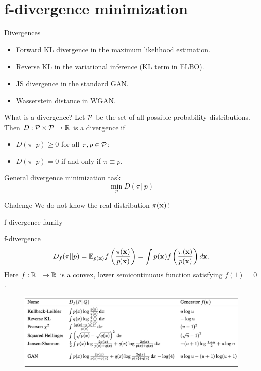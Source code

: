 \section{f-divergence minimization}
\begin{frame}{Divergences}
	\begin{itemize}
		\item Forward KL divergence in the maximum likelihood estimation.
		\item Reverse KL in the variational inference (KL term in ELBO).
		\item JS divergence in the standard GAN.
		\item Wasserstein distance in WGAN.
	\end{itemize}
	\begin{block}{What is a divergence?}
		Let $\mathcal{P}$ be the set of all possible probability distributions. Then $D: \mathcal{P} \times \mathcal{P} \rightarrow \mathbb{R}$ is a divergence if 
		\begin{itemize}
			\item $D(\pi || p) \geq 0$ for all $\pi, p \in \mathcal{P}$;
			\item $D(\pi || p) = 0$ if and only if $\pi \equiv p$.
		\end{itemize}
	\end{block}
	\begin{block}{General divergence minimization task}
		\vspace{-0.3cm}
		\[
			\min_p D(\pi || p)
		\]
		\vspace{-0.7cm}
	\end{block}
	\begin{block}{Chalenge}
		We do not know the real distribution $\pi(\mathbf{x})$!
	\end{block}
\end{frame}
\begin{frame}{f-divergence family}
	
	\begin{block}{f-divergence}
		\vspace{-0.3cm}
		\[
		D_f(\pi || p) = \mathbb{E}_{p(\mathbf{x})}  f\left( \frac{\pi(\mathbf{x})}{p(\mathbf{x})} \right)  = \int p(\mathbf{x}) f\left( \frac{\pi(\mathbf{x})}{p(\mathbf{x})} \right) d \mathbf{x}.
		\]
		Here $f: \mathbb{R}_+ \rightarrow \mathbb{R}$ is a convex, lower semicontinuous function satisfying $f(1) = 0$.
	\end{block}
	\begin{figure}
		\centering
		\includegraphics[width=\linewidth]{figs/f_divs}
	\end{figure}
\end{frame}
